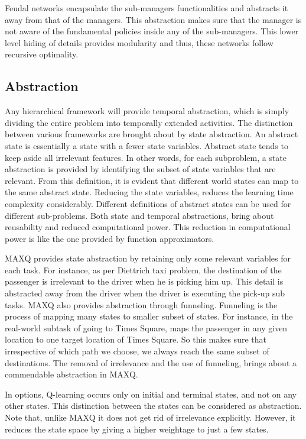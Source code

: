 Feudal networks encapsulate the sub-managers functionalities and abstracts it away from that of the managers. This abstraction makes sure that the manager is not aware of the fundamental policies inside any of the sub-managers. This lower level hiding of details provides modularity and thus, these networks follow recursive optimality. 


\subsection{Abstraction}

Any hierarchical framework will provide temporal abstraction, which is simply dividing the entire problem into temporally extended activities. The distinction between various frameworks are brought about by state abstraction. An abstract state is essentially a state with a fewer state variables. Abstract state tends to keep aside all irrelevant features. In other words, for each subproblem, a state abstraction is provided by identifying the subset of state variables that are relevant. From this definition, it is evident that different world states can map to the same abstract state. Reducing the state variables, reduces the learning time complexity considerably. Different definitions of abstract states can be used for different sub-problems. Both state and temporal abstractions, bring about reusability and reduced computational power. This reduction in computational power is like the one provided by function approximators. 

MAXQ provides state abstraction by retaining only some relevant variables for each task. For instance, as per Diettrich taxi problem, the destination of the passenger is irrelevant to the driver when he is picking him up. This detail is abstracted away from the driver when the driver is executing the pick-up sub tasks. MAXQ also provides abstraction through funneling. Funneling is the process of mapping many states to smaller subset of states. For instance, in the real-world subtask of going to Times Square, maps the passenger in any given location to one target location of Times Square. So this makes sure that irrespective of which path we choose, we always reach the same subset of destinations. The removal of irrelevance and the use of funneling, brings about a commendable abstraction in MAXQ.

In options, Q-learning occurs only on initial and terminal states, and not on any other states. This distinction between the states can be considered as abstraction. Note that, unlike MAXQ it does not get rid of irrelevance explicitly. However, it reduces the state space by giving a higher weightage to just a few states. 

